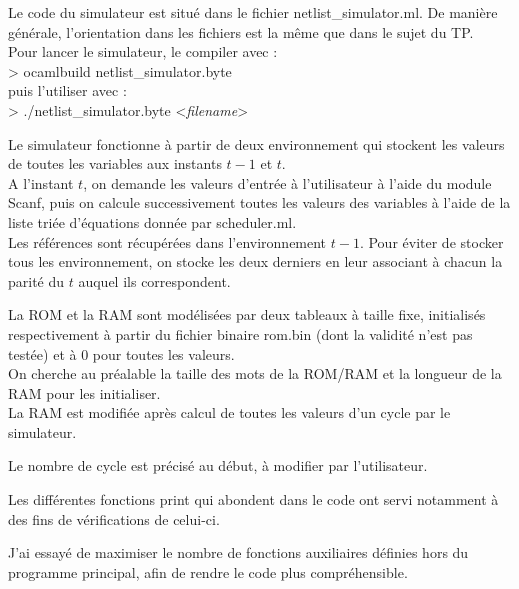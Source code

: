 \documentclass[a4paper]{article}
\begin{document}
Le code du simulateur est situé dans le fichier netlist\_simulator.ml. De manière générale, l'orientation dans les fichiers est la même que dans le sujet du TP.\\
Pour lancer le simulateur, le compiler avec :\\ > ocamlbuild netlist\_simulator.byte\\ puis l'utiliser avec :\\ > ./netlist\_simulator.byte <\emph{filename}>

Le simulateur fonctionne à partir de deux environnement qui stockent les valeurs de toutes les variables aux instants \(t-1\) et \(t\).\\
A l'instant \(t\), on demande les valeurs d'entrée à l'utilisateur à l'aide du module Scanf, puis on calcule successivement toutes les valeurs des variables à l'aide de la liste triée d'équations donnée par scheduler.ml.\\
Les références sont récupérées dans l'environnement \(t-1\). Pour éviter de stocker tous les environnement, on stocke les deux derniers en leur associant à chacun la parité du \(t\) auquel ils correspondent.

La ROM et la RAM sont modélisées par deux tableaux à taille fixe, initialisés respectivement à partir du fichier binaire rom.bin (dont la validité n'est pas testée) et à \(0\) pour toutes les valeurs.\\
On cherche au préalable la taille des mots de la ROM/RAM et la longueur de la RAM pour les initialiser.\\
La RAM est modifiée après calcul de toutes les valeurs d'un cycle par le simulateur.

Le nombre de cycle est précisé au début, à modifier par l'utilisateur.

Les différentes fonctions print qui abondent dans le code ont servi notamment à des fins de vérifications de celui-ci.

J'ai essayé de maximiser le nombre de fonctions auxiliaires définies hors du programme principal, afin de rendre le code plus compréhensible.
\end{document}
